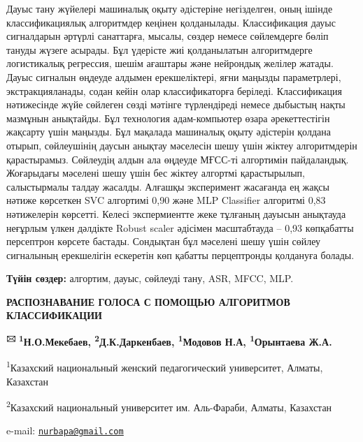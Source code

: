 \documentclass[
]{article}
\begin{document}
Дауыс тану жүйелері машиналық оқыту әдістеріне негізделген, оның ішінде
классификациялық алгоритмдер кеңінен қолданылады. Классификация дауыс
сигналдарын әртүрлі санаттарға, мысалы, сөздер немесе сөйлемдерге бөліп
тануды жүзеге асырады. Бұл үдерісте жиі қолданылатын алгоритмдерге
логистикалық регрессия, шешім ағаштары және нейрондық желілер жатады.
Дауыс сигналын өңдеуде алдымен ерекшеліктері, яғни маңызды параметрлері,
экстракцияланады, содан кейін олар классификаторға беріледі.
Классификация нәтижесінде жүйе сөйлеген сөзді мәтінге түрлендіреді
немесе дыбыстың нақты мазмұнын анықтайды. Бұл технология адам-компьютер
өзара әрекеттестігін жақсарту үшін маңызды. Бұл мақалада машиналық оқыту
әдістерін қолдана отырып, сөйлеушінің даусын анықтау мәселесін шешу үшін
жіктеу алгоритмдерін қарастырамыз. Сөйлеудің алдын ала өңдеуде МҒСС-ті
алгортимін пайдаландық. Жоғарыдағы мәселені шешу үшін бес жіктеу
алгортмі қарастырылып, салыстырмалы талдау жасалды. Алғашқы эксперимент
жасағанда ең жақсы нәтиже көрсеткен SVC алгортимі 0,90 және MLP
Classifier алгоритмі 0,83 нәтижелерін көрсетті. Келесі экспермиентте
жеке тұлғаның дауысын анықтауда неғұрлым үлкен дәлдікте Robust scaler
әдісімен масштабтауда -- 0,93 көпқабатты персептрон көрсете бастады.
Сондықтан бұл мәселені шешу үшін сөйлеу сигналының ерекшелігін ескеретін
көп қабатты перцептронды қолдануға болады.

\textbf{Түйін сөздер:} алгортим, дауыс, сөйлеуді тану, ASR, MFCC, MLP.

\textbf{РАСПОЗНАВАНИЕ ГОЛОСА С ПОМОЩЬЮ АЛГОРИТМОВ КЛАССИФИКАЦИИ}

\textbf{\textsuperscript{🖂 1}Н.О.Мекебаев,
\textsuperscript{2}Д.К.Даркенбаев, \textsuperscript{1}Модовов Н.А,
\textsuperscript{1}Орынтаева Ж.А.}

\textsuperscript{1}Казахский национальный женский педагогический
университет, Алматы, Казахстан

\textsuperscript{2}Казахский национальный университет им. Аль-Фараби,
Алматы, Казахстан

e-mail:
\ul{\href{mailto:nurbapa@gmail.com}{\nolinkurl{nurbapa@gmail.com}}}
\end{document}
